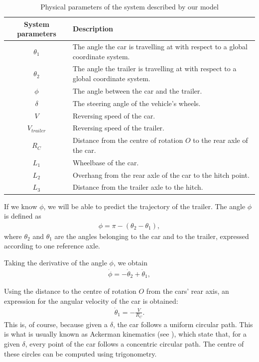 \begin{table}[H]
    \centering
    \begin{tabularx}{0.95\textwidth}{c X}
        \toprule
        \toprule
        System parameters & Description \\
        \midrule
        $\theta_{1}$  & The angle the car is travelling at with respect to a global coordinate system. \\
        $\theta_{2}$  & The angle the trailer is travelling at with respect to a global coordinate system. \\
        $\phi$        & The angle between the car and the trailer. \\
        $\delta$      & The steering angle of the vehicle's wheels. \\
        $V$           & Reversing speed of the car. \\
        $V_{trailer}$ & Reversing speed of the trailer. \\
        $R_{C}$       & Distance from the centre of rotation $O$ to the rear axle of the car. \\
        $L_{1}$       & Wheelbase of the car. \\
        $L_{2}$       & Overhang from the rear axle of the car to the hitch point. \\ 
        $L_{3}$       & Distance from the trailer axle to the hitch. \\ 
        \bottomrule
    \end{tabularx}
    \caption{Physical parameters of the system described by our model}
    \label{tab:parameters}
\end{table}

If we know $\phi$, we will be able to predict the trajectory of the trailer. The angle $\phi$ is defined as
\begin{align}
    \phi = \pi - (\theta_{2} - \theta_{1}) ,
\end{align}
where $\theta_{2}$ and $\theta_{1}$ are the angles belonging to the car and to the trailer, expressed according to one reference axle. 

Taking the derivative of the angle $\phi$, we obtain
\begin{align}\label{eq:dphi}
    \dot{\phi} = -\dot{\theta}_{2} + \dot{\theta}_{1} ,
\end{align}

Using the distance to the centre of rotation $O$ from the cars' rear axis, an expression for the angular velocity of the car is obtained:
\begin{align}\label{eq:dtheta1-0}
    \dot{\theta}_{1} = -\frac{V}{R_{C}} .
\end{align}
This is, of course, because given a $\delta$, the car follows a uniform circular path. This is what is usually known as Ackerman kinematics (see \cite{steering}), which state that, for a given $\delta$,
every point of the car follows a concentric circular path. The 
centre of these circles can be computed using trigonometry.\\

